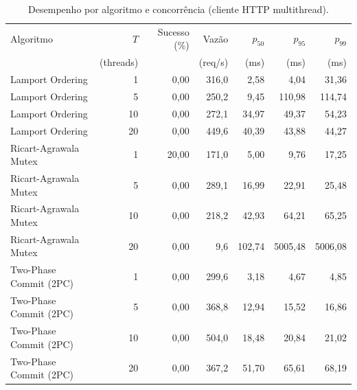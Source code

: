 \begin{table}[!t]
\centering
\caption{Desempenho por algoritmo e concorrência (cliente HTTP multithread).}
\label{tab:experiments}
\scriptsize
\setlength{\tabcolsep}{3pt}
\begin{tabular}{@{}l r r r r r r@{}}
\toprule
Algoritmo & $T$ & Sucesso (\%) & Vazão & $p_{50}$ & $p_{95}$ & $p_{99}$ \\
 & (threads) &  & (req/s) & (ms) & (ms) & (ms) \\
\midrule
Lamport Ordering & 1 & 0,00 & 316,0 & 2,58 & 4,04 & 31,36 \\
Lamport Ordering & 5 & 0,00 & 250,2 & 9,45 & 110,98 & 114,74 \\
Lamport Ordering & 10 & 0,00 & 272,1 & 34,97 & 49,37 & 54,23 \\
Lamport Ordering & 20 & 0,00 & 449,6 & 40,39 & 43,88 & 44,27 \\
Ricart-Agrawala Mutex & 1 & 20,00 & 171,0 & 5,00 & 9,76 & 17,25 \\
Ricart-Agrawala Mutex & 5 & 0,00 & 289,1 & 16,99 & 22,91 & 25,48 \\
Ricart-Agrawala Mutex & 10 & 0,00 & 218,2 & 42,93 & 64,21 & 65,25 \\
Ricart-Agrawala Mutex & 20 & 0,00 & 9,6 & 102,74 & 5005,48 & 5006,08 \\
Two-Phase Commit (2PC) & 1 & 0,00 & 299,6 & 3,18 & 4,67 & 4,85 \\
Two-Phase Commit (2PC) & 5 & 0,00 & 368,8 & 12,94 & 15,52 & 16,86 \\
Two-Phase Commit (2PC) & 10 & 0,00 & 504,0 & 18,48 & 20,84 & 21,02 \\
Two-Phase Commit (2PC) & 20 & 0,00 & 367,2 & 51,70 & 65,61 & 68,19 \\
\bottomrule
\end{tabular}
\end{table}
